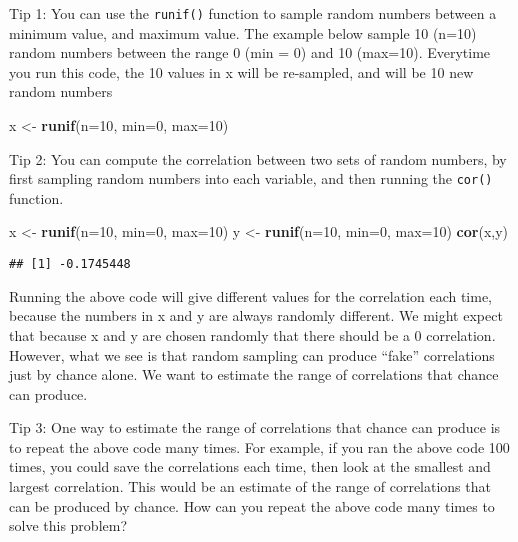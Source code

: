 \documentclass[
]{book}
\newenvironment{Shaded}{\begin{snugshade}}{\end{snugshade}}
\newcommand{\AttributeTok}[1]{\textcolor[rgb]{0.13,0.29,0.53}{#1}}
\newcommand{\DecValTok}[1]{\textcolor[rgb]{0.00,0.00,0.81}{#1}}
\newcommand{\FunctionTok}[1]{\textcolor[rgb]{0.13,0.29,0.53}{\textbf{#1}}}
\newcommand{\NormalTok}[1]{#1}
\newcommand{\OtherTok}[1]{\textcolor[rgb]{0.56,0.35,0.01}{#1}}
\begin{document}
Tip 1: You can use the \texttt{runif()} function to sample random numbers between a minimum value, and maximum value. The example below sample 10 (n=10) random numbers between the range 0 (min = 0) and 10 (max=10). Everytime you run this code, the 10 values in x will be re-sampled, and will be 10 new random numbers

\begin{Shaded}
\begin{Highlighting}[]
\NormalTok{x }\OtherTok{\textless{}{-}} \FunctionTok{runif}\NormalTok{(}\AttributeTok{n=}\DecValTok{10}\NormalTok{, }\AttributeTok{min=}\DecValTok{0}\NormalTok{, }\AttributeTok{max=}\DecValTok{10}\NormalTok{)}
\end{Highlighting}
\end{Shaded}

Tip 2: You can compute the correlation between two sets of random numbers, by first sampling random numbers into each variable, and then running the \texttt{cor()} function.

\begin{Shaded}
\begin{Highlighting}[]
\NormalTok{x }\OtherTok{\textless{}{-}} \FunctionTok{runif}\NormalTok{(}\AttributeTok{n=}\DecValTok{10}\NormalTok{, }\AttributeTok{min=}\DecValTok{0}\NormalTok{, }\AttributeTok{max=}\DecValTok{10}\NormalTok{)}
\NormalTok{y }\OtherTok{\textless{}{-}} \FunctionTok{runif}\NormalTok{(}\AttributeTok{n=}\DecValTok{10}\NormalTok{, }\AttributeTok{min=}\DecValTok{0}\NormalTok{, }\AttributeTok{max=}\DecValTok{10}\NormalTok{)}
\FunctionTok{cor}\NormalTok{(x,y)}
\end{Highlighting}
\end{Shaded}

\begin{verbatim}
## [1] -0.1745448
\end{verbatim}

Running the above code will give different values for the correlation each time, because the numbers in x and y are always randomly different. We might expect that because x and y are chosen randomly that there should be a 0 correlation. However, what we see is that random sampling can produce ``fake'' correlations just by chance alone. We want to estimate the range of correlations that chance can produce.

Tip 3: One way to estimate the range of correlations that chance can produce is to repeat the above code many times. For example, if you ran the above code 100 times, you could save the correlations each time, then look at the smallest and largest correlation. This would be an estimate of the range of correlations that can be produced by chance. How can you repeat the above code many times to solve this problem?
\end{document}
